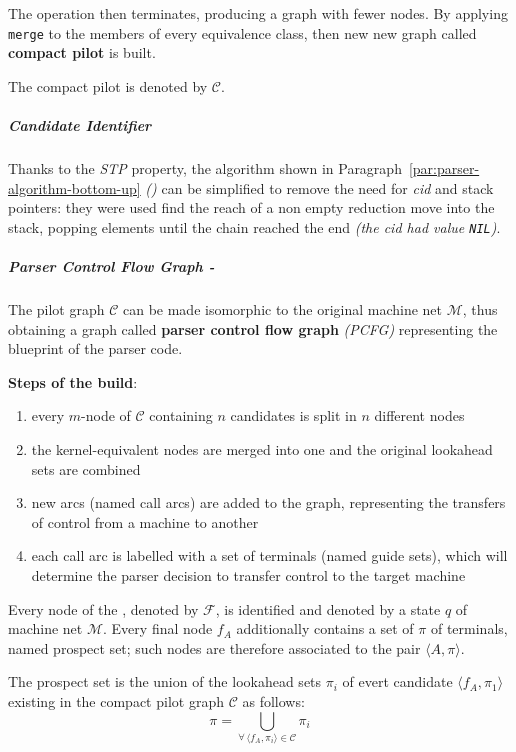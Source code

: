 \documentclass[english]{article}
\begin{document}
The operation then terminates, producing a graph with fewer nodes.
By applying \texttt{merge} to the members of every equivalence class, then new new graph called \textbf{compact pilot} is built.

The compact pilot is denoted by \(\mathcal{C}\).

\subparagraph*{Candidate Identifier}

Thanks to the \textit{STP} property, the algorithm shown in Paragraph~\ref{par:parser-algorithm-bottom-up} \textit{()} can be simplified to remove the need for \textit{cid} and stack pointers:
they were used find the reach of a non empty reduction move into the stack, popping elements until the chain reached the end \textit{(the \textit{cid} had value \texttt{NIL})}.

\subparagraph*{Parser Control Flow Graph - \PCFG}

The pilot graph \(\mathcal{C}\) can be made isomorphic to the original machine net \(\mathcal{M}\), thus obtaining a graph called \textbf{parser control flow graph} \textit{(PCFG)} representing the blueprint of the parser code.

\bigskip
\textbf{Steps of the build}:

\begin{enumerate}
  \item every \(m\)-node of \(\mathcal{C}\) containing \(n\) candidates is split in \(n\) different nodes
  \item the kernel-equivalent nodes are merged into one and the original lookahead sets are combined
  \item new arcs (named call arcs) are added to the graph, representing the transfers of control from a machine to another
  \item each call arc is labelled with a set of terminals (named guide sets), which will determine the parser decision to transfer control to the target machine
\end{enumerate}

\bigskip
Every node of the \PCFG, denoted by \(\mathcal{F}\), is identified and denoted by a state \(q\) of machine net \(\mathcal{M}\).
Every final node \(f_A\) additionally contains a set of \(\pi\) of terminals, named prospect set;
such nodes are therefore associated to the pair \(\langle A, \pi \rangle\).

The prospect set is the union of the lookahead sets \(\pi_i\) of evert candidate \(\langle f_A, \pi_1\rangle\) existing in the compact pilot graph \(\mathcal{C}\) as follows:
\[ \pi = \bigcup_{\forall \, \langle f_A, \pi_i \rangle \in \mathcal{C}} \pi_i \]
\end{document}
